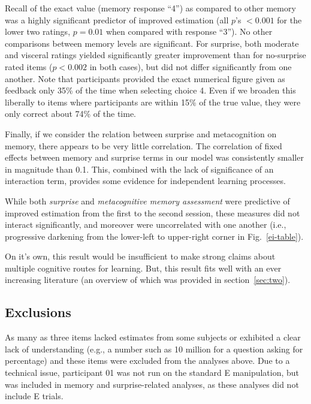 Recall of the exact value (memory response ``4'') as compared to other memory was
a highly significant predictor of improved estimation (all $p$'s $< 0.001$ for the
lower two ratings, $p = 0.01$ when compared with response ``3''). No other
comparisons between memory levels are significant. For surprise, both moderate
and visceral ratings yielded significantly greater improvement than for
no-surprise rated items ($p < 0.002$ in both cases), but did not differ
significantly from one another. Note that participants provided the exact
numerical figure given as feedback only 35\% of the time when selecting choice
4. Even if we broaden this liberally to items where participants are within 15\%
of the true value, they were only correct about 74\% of the time.

Finally, if we consider the relation between surprise and metacognition on
memory, there
appears to be very little correlation. The correlation of fixed effects between
memory and surprise terms in our model was consistently smaller in magnitude
than 0.1. This, combined with the lack of significance of an interaction term,
provides some evidence for independent learning processes.

While both \emph{surprise} and \emph{metacognitive memory assessment} were
predictive of improved estimation from the first to the second session, these
measures did not interact significantly, and moreover were uncorrelated with one
another (i.e., progressive darkening from the lower-left to upper-right corner
in Fig.~\ref{ei-table}).


On it's own, this result would be insufficient to make strong claims about
multiple cognitive routes for learning. But, this result fits well with an ever
increasing literature (an overview of which was provided in
section~\ref{sec:two}). 

\subsection{Exclusions}

As many as three items lacked estimates from some subjects or exhibited a clear
lack of understanding (e.g., a number such as 10 million for a question asking
for percentage) and these items were excluded from the analyses above. Due to a
technical issue, participant 01 was not run on the standard E manipulation, but
was included in memory and surprise-related analyses, as these analyses did not
include E trials.

